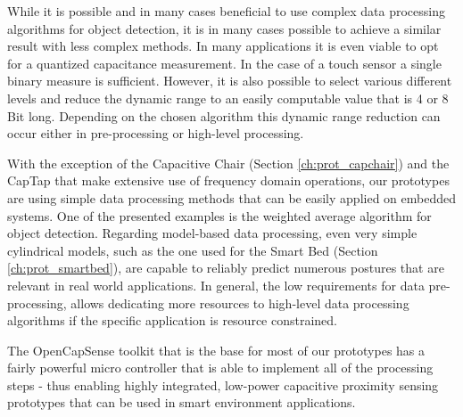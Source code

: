 While it is possible and in many cases beneficial to use complex data processing algorithms for object detection, it is in many cases possible to achieve a similar result with less complex methods. In many applications it is even viable to opt for a quantized capacitance measurement. In the case of a touch sensor a single binary measure is sufficient. However, it is also possible to select various different levels and reduce the dynamic range to an easily computable value that is 4 or 8 Bit long. Depending on the chosen algorithm this dynamic range reduction can occur either in pre-processing or high-level processing. 

With the exception of the Capacitive Chair (Section \ref{ch:prot_capchair}) and the CapTap that make extensive use of frequency domain operations, our prototypes are using simple data processing methods that can be easily applied on embedded systems. One of the presented examples is the weighted average algorithm for object detection. Regarding model-based data processing, even very simple cylindrical models, such as the one used for the Smart Bed (Section \ref{ch:prot_smartbed}), are capable to reliably predict numerous postures that are relevant in real world applications. In general, the low requirements for data pre-processing, allows dedicating more resources to high-level data processing algorithms if the specific application is resource constrained. 

The OpenCapSense toolkit that is the base for most of our prototypes has a fairly powerful micro controller that is able to implement all of the processing steps - thus enabling highly integrated, low-power capacitive proximity sensing prototypes that can be used in smart environment applications.
